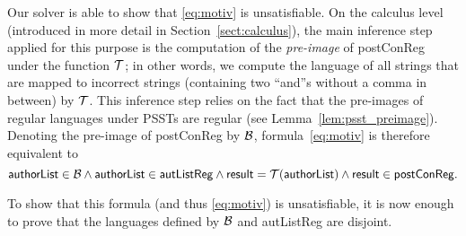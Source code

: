 Our solver is able to show that \eqref{eq:motiv} is unsatisfiable. On
the calculus level (introduced in more detail in
Section~\ref{sect:calculus}), the main inference step applied for this
purpose is the computation of the \emph{pre-image} of {\sf postConReg}
under the function
$\mathcal{T}$; in other words, we compute the language of all strings that are
mapped to incorrect strings (containing two ``\textsf{and}''s without
a comma in between) by
$\mathcal{T}$. This inference step relies on the fact that the pre-images of
regular languages under PSSTs are regular (see
Lemma~\ref{lem:psst_preimage}). Denoting the pre-image of {\sf
  postConReg}  by
$\mathcal{B}$, formula~\eqref{eq:motiv} is therefore equivalent to
\begin{equation}
  \label{eq:motiv2}
  {\sf authorList} \in \mathcal{B} \wedge
{\sf authorList} \in {\sf autListReg}\wedge {\sf result} = \mathcal{T}({\sf authorList}) \wedge {\sf result} \in {\sf postConReg}.
\end{equation}

To show that this formula (and thus \eqref{eq:motiv}) is
unsatisfiable, it is now enough to prove that the languages defined by
$\mathcal{B}$ and {\sf autListReg} are disjoint.

%
